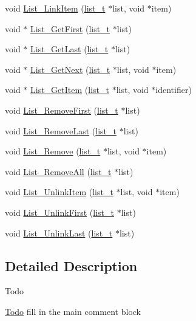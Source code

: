 \begin{DoxyCompactItemize}
void \hyperlink{group__list_gab6f45e11004da187e5637ab46831d39b}{List\+\_\+\+Link\+Item} (\hyperlink{structlist__t}{list\+\_\+t} $\ast$list, void $\ast$item)
\item 
void $\ast$ \hyperlink{group__list_ga8d33461dcffd998d929eff432f32949d}{List\+\_\+\+Get\+First} (\hyperlink{structlist__t}{list\+\_\+t} $\ast$list)
\item 
void $\ast$ \hyperlink{group__list_ga9dab427e2a969ed55c7b2367739f58bd}{List\+\_\+\+Get\+Last} (\hyperlink{structlist__t}{list\+\_\+t} $\ast$list)
\item 
void $\ast$ \hyperlink{group__list_ga4642790508a72a9e6af89eb654417154}{List\+\_\+\+Get\+Next} (\hyperlink{structlist__t}{list\+\_\+t} $\ast$list, void $\ast$item)
\item 
void $\ast$ \hyperlink{group__list_ga546288a184f0ac8d5a44e4eb8fb9aab6}{List\+\_\+\+Get\+Item} (\hyperlink{structlist__t}{list\+\_\+t} $\ast$list, void $\ast$identifier)
\item 
void \hyperlink{group__list_gafae6d0ac526e5f6e3234953e57230cb7}{List\+\_\+\+Remove\+First} (\hyperlink{structlist__t}{list\+\_\+t} $\ast$list)
\item 
void \hyperlink{group__list_ga5c4eb0789125264dc26f77760586d46b}{List\+\_\+\+Remove\+Last} (\hyperlink{structlist__t}{list\+\_\+t} $\ast$list)
\item 
void \hyperlink{group__list_ga80fa129ff1dfe7cc85d164d5a6fccf42}{List\+\_\+\+Remove} (\hyperlink{structlist__t}{list\+\_\+t} $\ast$list, void $\ast$item)
\item 
void \hyperlink{group__list_ga9aa26203c61296e5fd884941aa98a2cd}{List\+\_\+\+Remove\+All} (\hyperlink{structlist__t}{list\+\_\+t} $\ast$list)
\item 
void \hyperlink{group__list_ga215870e22beacb7be2d84aebcaf23e01}{List\+\_\+\+Unlink\+Item} (\hyperlink{structlist__t}{list\+\_\+t} $\ast$list, void $\ast$item)
\item 
void \hyperlink{group__list_ga71bd31a42180cf44b8ee3186c77765a8}{List\+\_\+\+Unlink\+First} (\hyperlink{structlist__t}{list\+\_\+t} $\ast$list)
\item 
void \hyperlink{group__list_ga79393298ee82007018a285e87f763857}{List\+\_\+\+Unlink\+Last} (\hyperlink{structlist__t}{list\+\_\+t} $\ast$list)
\end{DoxyCompactItemize}


\subsection{Detailed Description}
\begin{DoxyRefDesc}{Todo}
\item[\hyperlink{todo__todo000008}{Todo}]fill in the main comment block\end{DoxyRefDesc}


